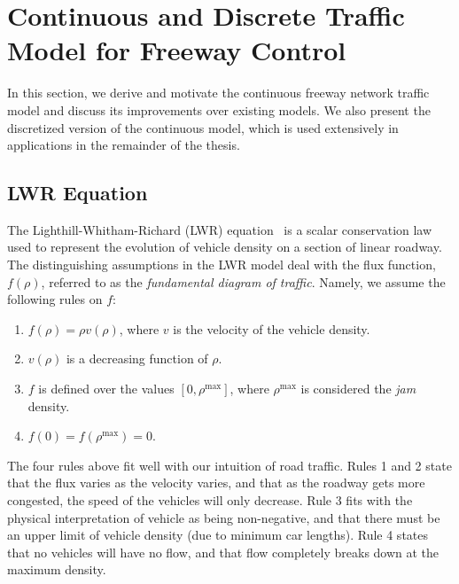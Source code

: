 \section{Continuous and Discrete Traffic Model for Freeway Control}
\label{sec:continous-and-discrete-traffic-model-for-ramp-metering}

In this section, we derive and motivate the continuous freeway network traffic model and discuss its improvements over existing models. We also present the discretized version of the continuous model, which is used extensively in applications in the remainder of the thesis. 

\subsection{LWR Equation}

The Lighthill-Whitham-Richard (LWR) equation~\cite{lighthill1955kinematic,richards1956shock} is a scalar conservation law used to represent the evolution of vehicle density on a section of linear roadway. The distinguishing assumptions in the LWR model deal with the flux function, $f\left(\rho\right)$, referred to as the \emph{fundamental diagram of traffic}. Namely, we assume the following rules on $f$:

\begin{enumerate}
	\item $f\left(\rho \right) = \rho v\left(\rho \right)$, where $v$ is the velocity of the vehicle density.
	\item $v\left(\rho \right)$ is a decreasing function of $\rho$.
	\item $f$ is defined over the values $\left[0,\rho^{\max}\right]$, where $\rho^{\max}$ is considered the \emph{jam} density.
	\item $f\left(0\right) = f\left(\rho^{\max}\right) = 0$.
\end{enumerate}

The four rules above fit well with our intuition of road traffic. Rules 1 and 2 state that the flux varies as the velocity varies, and that as the roadway gets more congested, the speed of the vehicles will only decrease. Rule 3 fits with the physical interpretation of vehicle as being non-negative, and that there must be an upper limit of vehicle density (due to minimum car lengths). Rule 4 states that no vehicles will have no flow, and that flow completely breaks down at the maximum density.

